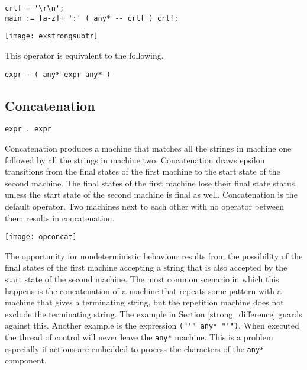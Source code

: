 \documentclass[letterpaper,11pt,oneside]{book}
\newcommand{\verbspace}{\vspace{10pt}}
\newcommand{\graphspace}{\vspace{10pt}}
\newenvironment{inline_code}{\def\baselinestretch{1}\vspace{12pt}\small}{}
\begin{document}
\begin{inline_code}
\begin{verbatim}
crlf = '\r\n';
main := [a-z]+ ':' ( any* -- crlf ) crlf;
\end{verbatim}
\end{inline_code}
\verbspace
% }%%
% END GENERATE

\graphspace
\begin{center}
\texttt{[image: exstrongsubtr]}
\end{center}
\graphspace

This operator is equivalent to the following.

\begin{verbatim}
expr - ( any* expr any* )
\end{verbatim}
\verbspace

\subsection{Concatenation}

\verb|expr . expr|

Concatenation produces a machine that matches all the strings in machine one followed by all
the strings in machine two.  Concatenation draws epsilon transitions from the
final states of the first machine to the start state of the second machine. The
final states of the first machine lose their final state status, unless the
start state of the second machine is final as well. 
Concatenation is the default operator. Two machines next to each other with no
operator between them results in concatenation.

\graphspace
\begin{center}
\texttt{[image: opconcat]}
\end{center}
\graphspace

The opportunity for nondeterministic behaviour results from the possibility of
the final states of the first machine accepting a string that is also accepted
by the start state of the second machine.
The most common scenario in which this happens is the
concatenation of a machine that repeats some pattern with a machine that gives
a terminating string, but the repetition machine does not exclude the
terminating string. The example in Section \ref{strong_difference}
guards against this. Another example is the expression \verb|("'" any* "'")|.
When executed the thread of control will
never leave the \verb|any*| machine.  This is a problem especially if actions
are embedded to process the characters of the \verb|any*| component.
\end{document}

